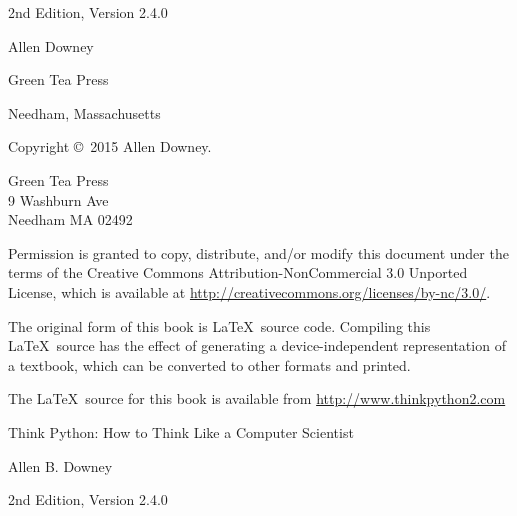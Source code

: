 \documentclass[10pt]{book}
\newcommand{\thetitle}{Think Python: How to Think Like a Computer Scientist}
\newcommand{\theversion}{2nd Edition, Version 2.4.0}
\newcommand{\thedate}{}
\begin{document}
\begin{latexonly}
\begin{flushright}
\vspace{0.25in}

\theversion

\thedate

\vspace{1in}


{\Large
Allen Downey\\
}


\vspace{0.5in}

{\Large Green Tea Press}

{\small Needham, Massachusetts}

\vfill

\end{flushright}


\pagebreak
\thispagestyle{empty}

{\small
Copyright \copyright ~2015 Allen Downey.


\vspace{0.2in}

\begin{flushleft}
Green Tea Press       \\
9 Washburn Ave        \\
Needham MA 02492
\end{flushleft}

Permission is granted to copy, distribute, and/or modify this document
under the terms of the Creative Commons Attribution-NonCommercial 3.0 Unported
License, which is available at \url{http://creativecommons.org/licenses/by-nc/3.0/}.

The original form of this book is \LaTeX\ source code. Compiling this
\LaTeX\ source has the effect of generating a device-independent
representation of a textbook, which can be converted to other formats
and printed.

The \LaTeX\ source for this book is available from
\url{http://www.thinkpython2.com}

\vspace{0.2in}

} %

\end{latexonly}



\begin{htmlonly}


{\Large \thetitle}

{\large Allen B. Downey}

\theversion

\thedate

\setcounter{chapter}{-1}

\end{htmlonly}
\end{document}

